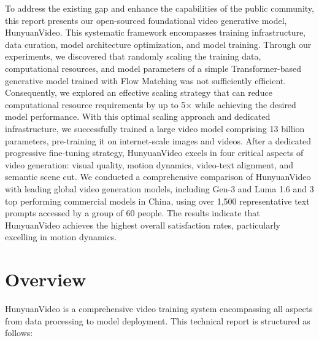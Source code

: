 \documentclass{article}
\newcommand{\nameofmethod}{HunyuanVideo}
\newcommand{\dq}[1]{\textcolor{cyan}{\bf\small [Daquan: #1]}}
\begin{document}
To address the existing gap and enhance the capabilities of the public community, this report presents our open-sourced foundational video generative model, \nameofmethod{}. This systematic framework encompasses training infrastructure, data curation, model architecture optimization, and model training.
%
Through our experiments, we discovered that randomly scaling the training data, computational resources, and model parameters of a simple Transformer-based generative model \cite{peebles2023scalable} trained with Flow Matching \cite{lipman2022flow} was not sufficiently efficient. Consequently, we explored an effective scaling strategy that can reduce computational resource requirements by up to 5× while achieving the desired model performance. With this optimal scaling approach and dedicated infrastructure, we successfully trained a large video model comprising 13 billion parameters, pre-training it on internet-scale images and videos.
%
After a dedicated progressive fine-tuning strategy, \nameofmethod{} excels in four critical aspects of video generation: visual quality, motion dynamics, video-text alignment, and semantic scene cut. We conducted a comprehensive comparison of \nameofmethod{} with leading global video generation models, including Gen-3 and Luma 1.6 and 3 top performing commercial models in China, using over 1,500 representative text prompts accessed by a group of 60 people. The results indicate that \nameofmethod{} achieves the highest overall satisfaction rates, particularly excelling in motion dynamics.


\section{Overview}
\label{sec:framework}
\nameofmethod{} is a comprehensive video training system encompassing all aspects from data processing to model deployment. This technical report is structured as follows:
\end{document}
